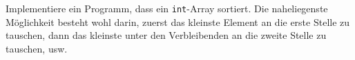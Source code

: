 \begin{aufg}
Implementiere ein Programm, dass ein \verb|int|-Array sortiert. Die naheliegenste Möglichkeit besteht wohl darin, zuerst das kleinste Element an die erste Stelle zu tauschen, dann das kleinste unter den Verbleibenden an die zweite Stelle zu tauschen, usw.
\end{aufg}